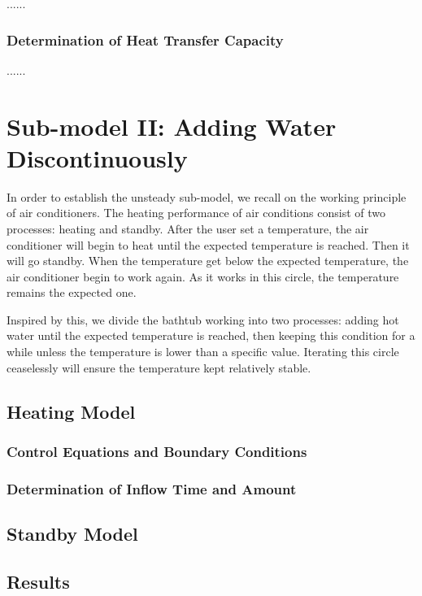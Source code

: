 \documentclass{mcmthesis}
\begin{document}
......

\subsubsection{Determination of Heat Transfer Capacity}

......

\section{Sub-model II: Adding Water Discontinuously}

In order to establish the unsteady sub-model, we recall on the working principle of air conditioners. The heating performance of air conditions consist of two processes: heating and standby. After the user set a temperature, the air conditioner will begin to heat until the expected temperature is reached. Then it will go standby. When the temperature get below the expected temperature, the air conditioner begin to work again. As it works in this circle, the temperature remains the expected one.

Inspired by this, we divide the bathtub working into two processes: adding
hot water until the expected temperature is reached, then keeping this
condition for a while unless the temperature is lower than a specific value. Iterating this circle ceaselessly will ensure the temperature kept relatively stable.

\subsection{Heating Model}

\subsubsection{Control Equations and Boundary Conditions}

\subsubsection{Determination of Inflow Time and Amount}

\subsection{Standby Model}

\subsection{Results}
\end{document}
